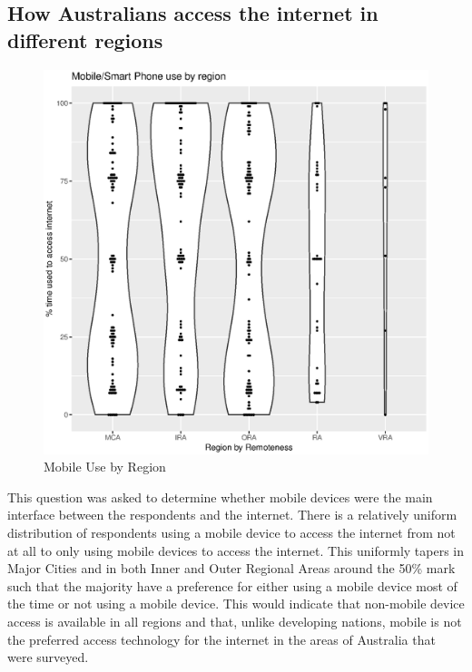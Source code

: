 \subsection{How Australians access the internet in different regions}

\begin{figure}
\centering
%
\includegraphics[scale=0.5]{figures/VChart01-MobileByRegion.eps} 
\caption{Mobile Use by Region}
\label{fig:VC01MobileRegions}
\end{figure}

This question was asked to determine whether mobile devices were the main interface between the respondents and the internet. There is a relatively uniform distribution of respondents using a mobile device to access the internet from not at all to only using mobile devices to access the internet. This uniformly tapers in Major Cities and in both Inner and Outer Regional Areas around the 50\% mark such that  the majority have a preference for either using a mobile device most of the time or not using a mobile device. This would indicate that non-mobile device access is available in all regions and that, unlike developing nations, mobile is not the preferred access technology for the internet in the areas of Australia that were surveyed.


